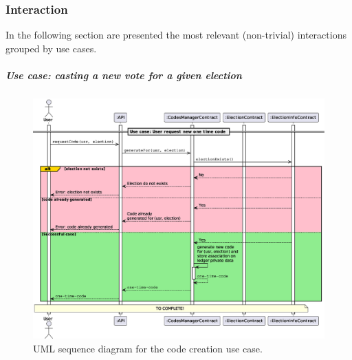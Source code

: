 \documentclass{scrartcl}
\begin{document}

\subsubsection{Interaction}


In the following section are presented the most relevant (non-trivial) interactions grouped by use cases.

\subparagraph*{Use case: casting a new vote for a given election}


\begin{figure}[h]
    \centering
    \includegraphics[width=\linewidth]{figures/code-creation-use-case.eps}
    \caption{UML sequence diagram for the code creation use case.}
    \label{fig:code-creation-use-case} 
\end{figure}
\end{document}
